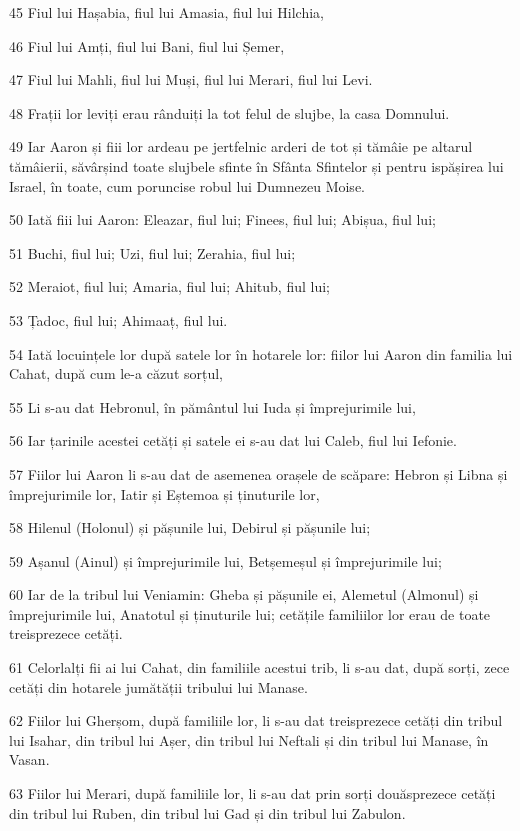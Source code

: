 \par 45 Fiul lui Hașabia, fiul lui Amasia, fiul lui Hilchia,
\par 46 Fiul lui Amți, fiul lui Bani, fiul lui Șemer,
\par 47 Fiul lui Mahli, fiul lui Muși, fiul lui Merari, fiul lui Levi.
\par 48 Frații lor leviți erau rânduiți la tot felul de slujbe, la casa Domnului.
\par 49 Iar Aaron și fiii lor ardeau pe jertfelnic arderi de tot și tămâie pe altarul tămâierii, săvârșind toate slujbele sfinte în Sfânta Sfintelor și pentru ispășirea lui Israel, în toate, cum poruncise robul lui Dumnezeu Moise.
\par 50 Iată fiii lui Aaron: Eleazar, fiul lui; Finees, fiul lui; Abișua, fiul lui;
\par 51 Buchi, fiul lui; Uzi, fiul lui; Zerahia, fiul lui;
\par 52 Meraiot, fiul lui; Amaria, fiul lui; Ahitub, fiul lui;
\par 53 Țadoc, fiul lui; Ahimaaț, fiul lui.
\par 54 Iată locuințele lor după satele lor în hotarele lor: fiilor lui Aaron din familia lui Cahat, după cum le-a căzut sorțul,
\par 55 Li s-au dat Hebronul, în pământul lui Iuda și împrejurimile lui,
\par 56 Iar țarinile acestei cetăți și satele ei s-au dat lui Caleb, fiul lui Iefonie.
\par 57 Fiilor lui Aaron li s-au dat de asemenea orașele de scăpare: Hebron și Libna și împrejurimile lor, Iatir și Eștemoa și ținuturile lor,
\par 58 Hilenul (Holonul) și pășunile lui, Debirul și pășunile lui;
\par 59 Așanul (Ainul) și împrejurimile lui, Betșemeșul și împrejurimile lui;
\par 60 Iar de la tribul lui Veniamin: Gheba și pășunile ei, Alemetul (Almonul) și împrejurimile lui, Anatotul și ținuturile lui; cetățile familiilor lor erau de toate treisprezece cetăți.
\par 61 Celorlalți fii ai lui Cahat, din familiile acestui trib, li s-au dat, după sorți, zece cetăți din hotarele jumătății tribului lui Manase.
\par 62 Fiilor lui Gherșom, după familiile lor, li s-au dat treisprezece cetăți din tribul lui Isahar, din tribul lui Așer, din tribul lui Neftali și din tribul lui Manase, în Vasan.
\par 63 Fiilor lui Merari, după familiile lor, li s-au dat prin sorți douăsprezece cetăți din tribul lui Ruben, din tribul lui Gad și din tribul lui Zabulon.
